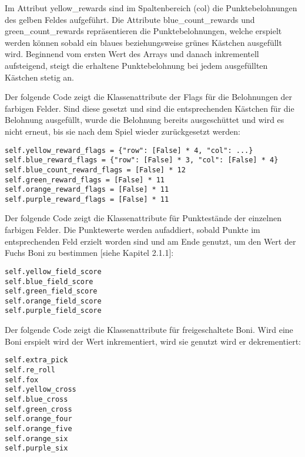 Im Attribut yellow\_rewards sind im Spaltenbereich (col) die Punktebelohnungen des gelben Feldes aufgeführt. Die Attribute blue\_count\_rewards und green\_count\_rewards repräsentieren die Punktebelohnungen, welche erspielt werden können sobald ein blaues beziehungsweise grünes Kästchen ausgefüllt wird. Beginnend vom ersten Wert des Arrays und danach inkrementell aufsteigend, steigt die erhaltene Punktebelohnung bei jedem ausgefüllten Kästchen stetig an.\\

\begin{minipage}{\linewidth}
Der folgende Code zeigt die Klassenattribute der Flags für die Belohnungen der farbigen Felder. Sind diese gesetzt und sind die entsprechenden Kästchen für die Belohnung ausgefüllt, wurde die Belohnung bereits ausgeschüttet und wird es nicht erneut, bis sie nach dem Spiel wieder zurückgesetzt werden:
\vspace{0.5cm}
\begin{lstlisting}[caption={Klassenattribute für Belohnungsflags}]
self.yellow_reward_flags = {"row": [False] * 4, "col": ...}
self.blue_reward_flags = {"row": [False] * 3, "col": [False] * 4}
self.blue_count_reward_flags = [False] * 12
self.green_reward_flags = [False] * 11
self.orange_reward_flags = [False] * 11
self.purple_reward_flags = [False] * 11
\end{lstlisting}
\end{minipage}

\begin{minipage}{\linewidth}
Der folgende Code zeigt die Klassenattribute für Punktestände der einzelnen farbigen Felder. Die Punktewerte werden aufaddiert, sobald Punkte im entsprechenden Feld erzielt worden sind und am Ende genutzt, um den Wert der Fuchs Boni zu bestimmen [siehe Kapitel 2.1.1]:
\vspace{0.5cm}
\begin{lstlisting}[caption={Klassenattribute für Punktestände der Felder}]
self.yellow_field_score
self.blue_field_score
self.green_field_score
self.orange_field_score
self.purple_field_score
\end{lstlisting}
\end{minipage}

\begin{minipage}{\linewidth}
Der folgende Code zeigt die Klassenattribute für freigeschaltete Boni. Wird eine Boni erspielt wird der Wert inkrementiert, wird sie genutzt wird er dekrementiert:
\vspace{0.5cm}
\begin{lstlisting}[caption={Klassenattribute für freigespielte Boni}]
self.extra_pick
self.re_roll
self.fox
self.yellow_cross
self.blue_cross
self.green_cross
self.orange_four
self.orange_five
self.orange_six
self.purple_six
\end{lstlisting}
\end{minipage}

